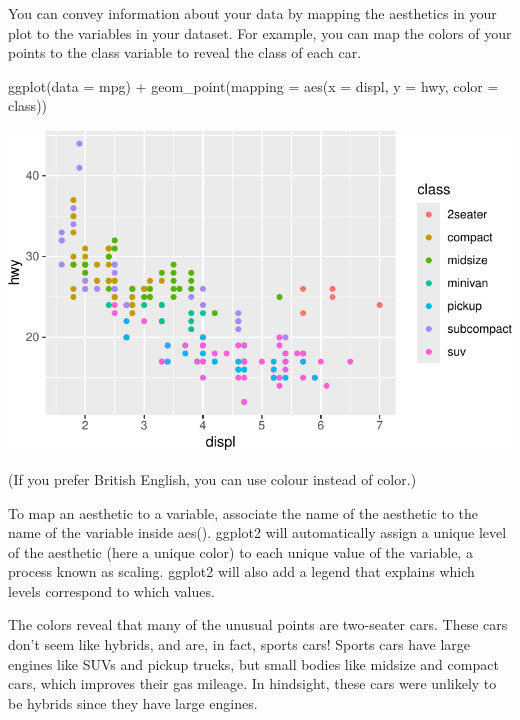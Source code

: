 \documentclass[
  letterpaper,
  DIV=11,
  numbers=noendperiod]{scrreprt}
\newenvironment{Shaded}{\begin{snugshade}}{\end{snugshade}}
\newcommand{\AttributeTok}[1]{\textcolor[rgb]{0.40,0.45,0.13}{#1}}
\newcommand{\FunctionTok}[1]{\textcolor[rgb]{0.28,0.35,0.67}{#1}}
\newcommand{\NormalTok}[1]{\textcolor[rgb]{0.00,0.23,0.31}{#1}}
\newcommand{\SpecialCharTok}[1]{\textcolor[rgb]{0.37,0.37,0.37}{#1}}
\begin{document}
You can convey information about your data by mapping the aesthetics in
your plot to the variables in your dataset. For example, you can map the
colors of your points to the class variable to reveal the class of each
car.

\begin{Shaded}
\begin{Highlighting}[]
\FunctionTok{ggplot}\NormalTok{(}\AttributeTok{data =}\NormalTok{ mpg) }\SpecialCharTok{+}
  \FunctionTok{geom\_point}\NormalTok{(}\AttributeTok{mapping =} \FunctionTok{aes}\NormalTok{(}\AttributeTok{x =}\NormalTok{ displ, }\AttributeTok{y =}\NormalTok{ hwy, }\AttributeTok{color =}\NormalTok{ class))}
\end{Highlighting}
\end{Shaded}

\includegraphics{Beginning_Data_Visualization_files/figure-pdf/Example-1.pdf}

(If you prefer British English, you can use colour instead of color.)

To map an aesthetic to a variable, associate the name of the aesthetic
to the name of the variable inside aes(). ggplot2 will automatically
assign a unique level of the aesthetic (here a unique color) to each
unique value of the variable, a process known as scaling. ggplot2 will
also add a legend that explains which levels correspond to which values.

The colors reveal that many of the unusual points are two-seater cars.
These cars don't seem like hybrids, and are, in fact, sports cars!
Sports cars have large engines like SUVs and pickup trucks, but small
bodies like midsize and compact cars, which improves their gas mileage.
In hindsight, these cars were unlikely to be hybrids since they have
large engines.
\end{document}
